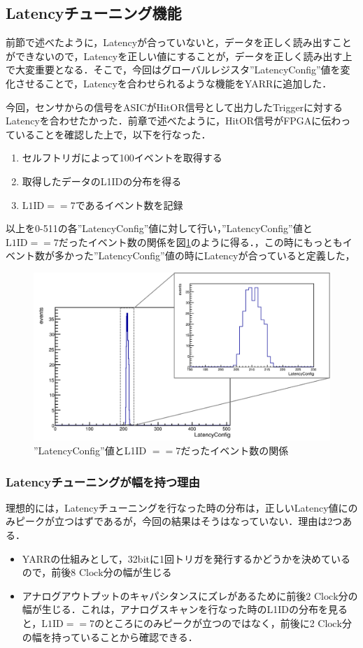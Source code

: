 \subsection{Latencyチューニング機能}
前節で述べたように，Latencyが合っていないと，データを正しく読み出すことができないので，Latencyを正しい値にすることが，データを正しく読み出す上で大変重要となる．そこで，今回はグローバルレジスタ''LatencyConfig''値を変化させることで，Latencyを合わせられるような機能をYARRに追加した．\par
今回，センサからの信号をASICがHitOR信号として出力したTriggerに対するLatencyを合わせたかった．前章で述べたように，HitOR信号がFPGAに伝わっていることを確認した上で，以下を行なった．
\begin{enumerate}
\item セルフトリガによって100イベントを取得する
\item 取得したデータのL1IDの分布を得る
\item $\mathrm{L1ID} == 7$であるイベント数を記録
\end{enumerate}
以上を0-511の各''LatencyConfig''値に対して行い，''LatencyConfig''値と$\mathrm{L1ID} == 7$だったイベント数の関係を図\ref{fig:latencydist}のように得る．，この時にもっともイベント数が多かった''LatencyConfig''値の時にLatencyが合っていると定義した，

\begin{figure}[h]
  \centering
  \includegraphics[width=14cm]{./figure/latencydist.png}
  \caption{''LatencyConfig''値とL1ID $== 7$だったイベント数の関係}
  \label{fig:latencydist}
\end{figure}


\subsubsection{Latencyチューニングが幅を持つ理由}
理想的には，Latencyチューニングを行なった時の分布は，正しいLatency値にのみピークが立つはずであるが，今回の結果はそうはなっていない．理由は2つある．
\begin{itemize}
\item YARRの仕組みとして，32bitに1回トリガを発行するかどうかを決めているので，前後8 $\mathrm{Clock}$分の幅が生じる
\item アナログアウトプットのキャパシタンスにズレがあるために前後2 $\mathrm{Clock}$分の幅が生じる．これは，アナログスキャンを行なった時のL1IDの分布を見ると，$\mathrm{L1ID} == 7$のところにのみピークが立つのではなく，前後に2 $\mathrm{Clock}$分の幅を持っていることから確認できる．
\end{itemize}

